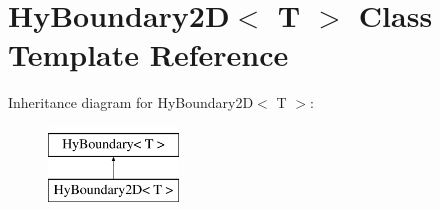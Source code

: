 \hypertarget{classHyBoundary2D}{
\section{HyBoundary2D$<$ T $>$ Class Template Reference}
\label{classHyBoundary2D}
}
Inheritance diagram for HyBoundary2D$<$ T $>$:\begin{figure}[H]
\begin{center}
\leavevmode
\includegraphics[height=2cm]{classHyBoundary2D}
\end{center}
\end{figure}
